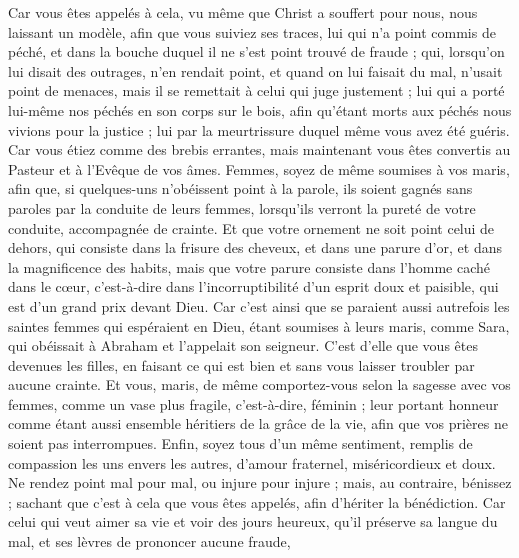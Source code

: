 \begin{multicols}{2}
Car vous êtes appelés à cela, vu même que Christ a souffert pour nous, nous laissant un modèle, afin que vous suiviez ses traces, 
lui qui n'a point commis de péché, et dans la bouche duquel il ne s'est point trouvé de fraude ;
qui, lorsqu'on lui disait des outrages, n'en rendait point, et quand on lui faisait du mal, n'usait point de menaces, mais il se remettait à celui qui juge justement ; 
lui qui a porté lui-même nos péchés en son corps sur le bois, afin qu'étant morts aux péchés nous vivions pour la justice ; lui par la meurtrissure duquel même vous avez été guéris.
Car vous étiez comme des brebis errantes, mais maintenant vous êtes convertis au Pasteur et à l'Evêque de vos âmes. 
\VerseOne{}Femmes, soyez de même soumises à vos maris, afin que, si quelques-uns n'obéissent point à la parole, ils soient gagnés sans paroles par la conduite de leurs femmes,
lorsqu'ils verront la pureté de votre conduite, accompagnée de crainte.
Et que votre ornement ne soit point celui de dehors, qui consiste dans la frisure des cheveux, et dans une parure d'or, et dans la magnificence des habits,
mais que votre parure consiste dans l’homme caché dans le cœur, c’est-à-dire dans l’incorruptibilité d’un esprit doux et paisible, qui est d’un grand prix devant Dieu.
Car c'est ainsi que se paraient aussi autrefois les saintes femmes qui espéraient en Dieu, étant soumises à leurs maris,
comme Sara, qui obéissait à Abraham et l'appelait son seigneur. C'est d'elle que vous êtes devenues les filles, en faisant ce qui est bien et sans vous laisser troubler par aucune crainte.
Et vous, maris, de même comportez-vous selon la sagesse avec vos femmes, comme un vase plus fragile, c'est-à-dire, féminin ; leur portant honneur comme étant aussi ensemble héritiers de la grâce de la vie, afin que vos prières ne soient pas interrompues. 
Enfin, soyez tous d'un même sentiment, remplis de compassion les uns envers les autres, d'amour fraternel, miséricordieux et doux.
Ne rendez point mal pour mal, ou injure pour injure ; mais, au contraire, bénissez ; sachant que c'est à cela que vous êtes appelés, afin d'hériter la bénédiction.
Car celui qui veut aimer sa vie et voir des jours heureux, qu'il préserve sa langue du mal, et ses lèvres de prononcer aucune fraude,

\end{multicols}

